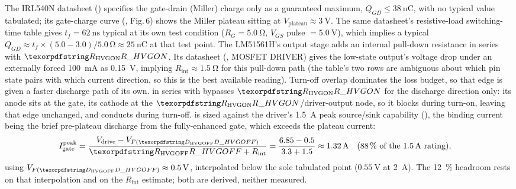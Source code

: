 \begin{description}[style=nextline]
  \item[Turn-off overlap]
    The IRL540N datasheet () specifies
    the gate-drain (Miller) charge only as a guaranteed maximum, $Q_{GD} \le
    \SI{38}{\nano\coulomb}$, with no typical value tabulated; its gate-charge
    curve (, Fig.\,6) shows the Miller
    plateau sitting at $V_{\mathrm{plateau}} \approx \SI{3}{\volt}$. The same
    datasheet's resistive-load switching-time table gives $t_f =
    \SI{62}{\nano\second}$ typical at its own test condition
    ($R_G=\SI{5.0}{\ohm}$, $V_{GS}$ pulse $=\SI{5.0}{\volt}$), which implies a
    typical $Q_{GD} \approx t_f \times (5.0-3.0)/5.0\,\si{\ohm} \approx
    \SI{25}{\nano\coulomb}$ at that test point. The LM51561H's output stage adds
    an internal pull-down resistance in series with $\des{R}{HVGON}$. Its datasheet
    (, MOSFET DRIVER) gives the low-state output's voltage
    drop under an externally forced \SI{100}{\milli\ampere} as \SI{0.15}{\volt},
    implying $R_{\mathrm{int}} \approx \SI{1.5}{\ohm}$ for this pull-down path
    (the table's two rows are ambiguous about which pin state pairs with
    which current direction, so this is the best available reading).
    Turn-off overlap dominates the loss budget, so that edge is given a faster
    discharge path of its own.  in series with
     bypasses $\des{R}{HVGON}$ for the discharge direction only:
    its anode sits at the gate, its cathode at the
    $\des{R}{HVGON}$/driver-output node, so it blocks during turn-on, leaving
    that edge unchanged, and conducts during turn-off.  is sized
    against the driver's \SI{1.5}{\ampere} peak source/sink capability
    (), the binding current being the brief pre-plateau
    discharge from the fully-enhanced gate, which exceeds the plateau current:
    \begin{align*}
      I_{\mathrm{gate}}^{\mathrm{peak}} &= \frac{V_{\mathrm{drive}} -
        V_{F(\des{D}{HVGOFF})}}{\des{R}{HVGOFF} + R_{\mathrm{int}}}
        = \frac{6.85 - 0.5}{3.3+1.5} \approx \SI{1.32}{\ampere}
        \quad (88\,\% \text{ of the } \SI{1.5}{\ampere} \text{ rating}),
    \end{align*}
    using $V_{F(\des{D}{HVGOFF})} \approx \SI{0.5}{\volt}$, interpolated below
    the sole tabulated point ($\SI{0.55}{\volt}$ at \SI{2}{\ampere}). The
    \SI{12}{\percent} headroom rests on that interpolation and on the
    $R_{\mathrm{int}}$ estimate; both are derived, neither measured.

\end{description}
